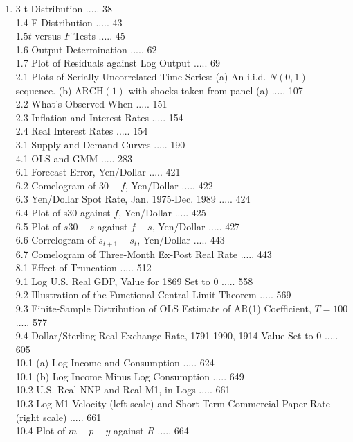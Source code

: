 \documentclass[10pt]{article}
\begin{document}
\begin{enumerate}
  \item 3 t Distribution ..... 38\\
1.4 F Distribution ..... 43\\
$1.5 t$-versus $F$-Tests ..... 45\\
1.6 Output Determination ..... 62\\
1.7 Plot of Residuals against Log Output ..... 69\\
2.1 Plots of Serially Uncorrelated Time Series: (a) An i.i.d. $N(0,1)$ sequence. (b) $\mathrm{ARCH}(1)$ with shocks taken from panel (a) ..... 107\\
2.2 What's Observed When ..... 151\\
2.3 Inflation and Interest Rates ..... 154\\
2.4 Real Interest Rates ..... 154\\
3.1 Supply and Demand Curves ..... 190\\
4.1 OLS and GMM ..... 283\\
6.1 Forecast Error, Yen/Dollar ..... 421\\
6.2 Comelogram of $30-f$, Yen/Dollar ..... 422\\
6.3 Yen/Dollar Spot Rate, Jan. 1975-Dec. 1989 ..... 424\\
6.4 Plot of s30 against $f$, Yen/Dollar ..... 425\\
6.5 Plot of $s 30-s$ against $f-s$, Yen/Dollar ..... 427\\
6.6 Correlogram of $s_{t+1}-s_{t}$, Yen/Dollar ..... 443\\
6.7 Comelogram of Three-Month Ex-Post Real Rate ..... 443\\
8.1 Effect of Truncation ..... 512\\
9.1 Log U.S. Real GDP, Value for 1869 Set to 0 ..... 558\\
9.2 Illustration of the Functional Central Limit Theorem ..... 569\\
9.3 Finite-Sample Distribution of OLS Estimate of AR(1) Coefficient, $T=100$ ..... 577\\
9.4 Dollar/Sterling Real Exchange Rate, 1791-1990, 1914 Value Set to 0 ..... 605\\
10.1 (a) Log Income and Consumption ..... 624\\
10.1 (b) Log Income Minus Log Consumption ..... 649\\
10.2 U.S. Real NNP and Real M1, in Logs ..... 661\\
10.3 Log M1 Velocity (left scale) and Short-Term Commercial Paper Rate (right scale) ..... 661\\
10.4 Plot of $m-p-y$ against $R$ ..... 664
\end{enumerate}
\end{document}
